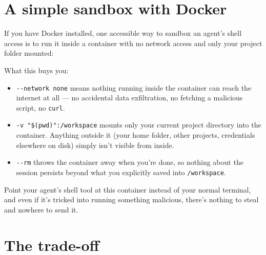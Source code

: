 \documentclass[
  letterpaper,
  DIV=11,
  numbers=noendperiod]{scrreprt}
\newenvironment{Shaded}{\begin{snugshade}}{\end{snugshade}}
\newcommand{\AttributeTok}[1]{\textcolor[rgb]{0.40,0.45,0.13}{#1}}
\newcommand{\BuiltInTok}[1]{\textcolor[rgb]{0.00,0.23,0.31}{#1}}
\newcommand{\DataTypeTok}[1]{\textcolor[rgb]{0.68,0.00,0.00}{#1}}
\newcommand{\ExtensionTok}[1]{\textcolor[rgb]{0.00,0.23,0.31}{#1}}
\newcommand{\NormalTok}[1]{\textcolor[rgb]{0.00,0.23,0.31}{#1}}
\newcommand{\StringTok}[1]{\textcolor[rgb]{0.13,0.47,0.30}{#1}}
\newcommand{\VariableTok}[1]{\textcolor[rgb]{0.07,0.07,0.07}{#1}}
\providecommand{\tightlist}{%
  \setlength{\itemsep}{0pt}\setlength{\parskip}{0pt}}
\begin{document}
\section{A simple sandbox with
Docker}\label{a-simple-sandbox-with-docker}

If you have Docker installed, one accessible way to sandbox an agent's
shell access is to run it inside a container with no network access and
only your project folder mounted:

\begin{Shaded}
\end{Shaded}

What this buys you:

\begin{itemize}
\tightlist
\item
  \texttt{-\/-network\ none} means nothing running inside the container
  can reach the internet at all --- no accidental data exfiltration, no
  fetching a malicious script, no \texttt{curl}.
\item
  \texttt{-v\ "\$(pwd)":/workspace} mounts only your current project
  directory into the container. Anything outside it (your home folder,
  other projects, credentials elsewhere on disk) simply isn't visible
  from inside.
\item
  \texttt{-\/-rm} throws the container away when you're done, so nothing
  about the session persists beyond what you explicitly saved into
  \texttt{/workspace}.
\end{itemize}

Point your agent's shell tool at this container instead of your normal
terminal, and even if it's tricked into running something malicious,
there's nothing to steal and nowhere to send it.

\section{The trade-off}\label{the-trade-off}
\end{document}

